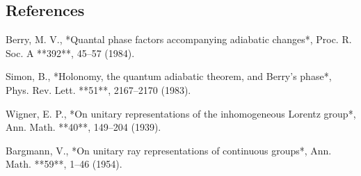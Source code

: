 \documentclass[11pt]{article}
\begin{document}
\subsection{References}

Berry, M. V., *Quantal phase factors accompanying adiabatic changes*, Proc. R. Soc. A **392**, 45–57 (1984).

Simon, B., *Holonomy, the quantum adiabatic theorem, and Berry's phase*, Phys. Rev. Lett. **51**, 2167–2170 (1983).

Wigner, E. P., *On unitary representations of the inhomogeneous Lorentz group*, Ann. Math. **40**, 149–204 (1939).

Bargmann, V., *On unitary ray representations of continuous groups*, Ann. Math. **59**, 1–46 (1954).
\end{document}
